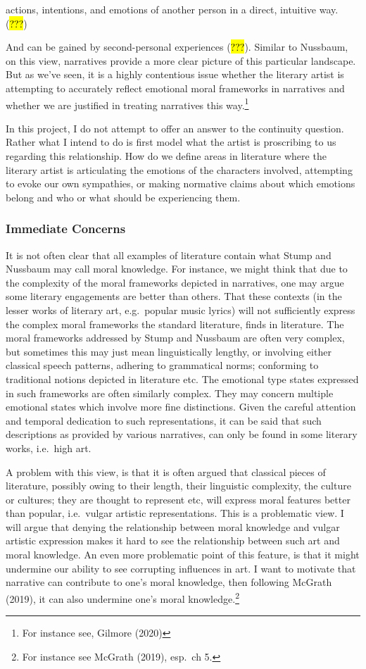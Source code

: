 \documentclass[
  letterpaper,
  DIV=11,
  numbers=noendperiod]{scrartcl}
\theoremstyle{remark}
\begin{document}
actions, intentions, and emotions of another person in a direct,
intuitive way. (\hl{???})

And can be gained by second-personal experiences (\hl{???}). Similar to
Nussbaum, on this view, narratives provide a more clear picture of this
particular landscape. But as we've seen, it is a highly contentious
issue whether the literary artist is attempting to accurately reflect
emotional moral frameworks in narratives and whether we are justified in
treating narratives this way.\footnote{For instance see, Gilmore (2020)}

In this project, I do not attempt to offer an answer to the continuity
question. Rather what I intend to do is first model what the artist is
proscribing to us regarding this relationship. How do we define areas in
literature where the literary artist is articulating the emotions of the
characters involved, attempting to evoke our own sympathies, or making
normative claims about which emotions belong and who or what should be
experiencing them.

\subsubsection{Immediate Concerns}\label{immediate-concerns}

It is not often clear that all examples of literature contain what Stump
and Nussbaum may call moral knowledge. For instance, we might think that
due to the complexity of the moral frameworks depicted in narratives,
one may argue some literary engagements are better than others. That
these contexts (in the lesser works of literary art, e.g.~popular music
lyrics) will not sufficiently express the complex moral frameworks the
standard literature, finds in literature. The moral frameworks addressed
by Stump and Nussbaum are often very complex, but sometimes this may
just mean linguistically lengthy, or involving either classical speech
patterns, adhering to grammatical norms; conforming to traditional
notions depicted in literature etc. The emotional type states expressed
in such frameworks are often similarly complex. They may concern
multiple emotional states which involve more fine distinctions. Given
the careful attention and temporal dedication to such representations,
it can be said that such descriptions as provided by various narratives,
can only be found in some literary works, i.e.~high art.

A problem with this view, is that it is often argued that classical
pieces of literature, possibly owing to their length, their linguistic
complexity, the culture or cultures; they are thought to represent etc,
will express moral features better than popular, i.e.~vulgar artistic
representations. This is a problematic view. I will argue that denying
the relationship between moral knowledge and vulgar artistic expression
makes it hard to see the relationship between such art and moral
knowledge. An even more problematic point of this feature, is that it
might undermine our ability to see corrupting influences in art. I want
to motivate that narrative can contribute to one's moral knowledge, then
following McGrath (2019), it can also undermine one's moral
knowledge.\footnote{For instance see McGrath (2019), esp.~ch 5.}
\end{document}
